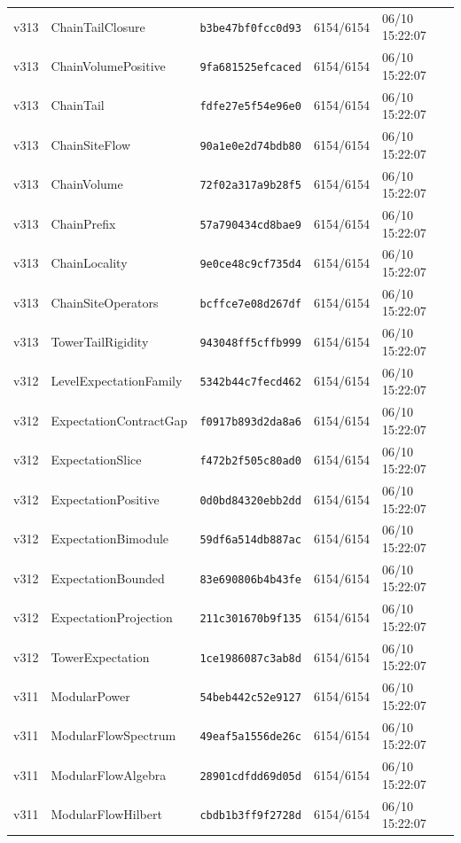 \documentclass[11pt]{article}
\theoremstyle{definition}\newtheorem{deriv}{Derivation}
\begin{document}
{\begin{longtable}{@{}lllll@{}}
v313 & ChainTailClosure & \texttt{b3be47bf0fcc0d93} & 6154/6154 & 06/10 15:22:07 \\
v313 & ChainVolumePositive & \texttt{9fa681525efcaced} & 6154/6154 & 06/10 15:22:07 \\
v313 & ChainTail & \texttt{fdfe27e5f54e96e0} & 6154/6154 & 06/10 15:22:07 \\
v313 & ChainSiteFlow & \texttt{90a1e0e2d74bdb80} & 6154/6154 & 06/10 15:22:07 \\
v313 & ChainVolume & \texttt{72f02a317a9b28f5} & 6154/6154 & 06/10 15:22:07 \\
v313 & ChainPrefix & \texttt{57a790434cd8bae9} & 6154/6154 & 06/10 15:22:07 \\
v313 & ChainLocality & \texttt{9e0ce48c9cf735d4} & 6154/6154 & 06/10 15:22:07 \\
v313 & ChainSiteOperators & \texttt{bcffce7e08d267df} & 6154/6154 & 06/10 15:22:07 \\
v313 & TowerTailRigidity & \texttt{943048ff5cffb999} & 6154/6154 & 06/10 15:22:07 \\
v312 & LevelExpectationFamily & \texttt{5342b44c7fecd462} & 6154/6154 & 06/10 15:22:07 \\
v312 & ExpectationContractGap & \texttt{f0917b893d2da8a6} & 6154/6154 & 06/10 15:22:07 \\
v312 & ExpectationSlice & \texttt{f472b2f505c80ad0} & 6154/6154 & 06/10 15:22:07 \\
v312 & ExpectationPositive & \texttt{0d0bd84320ebb2dd} & 6154/6154 & 06/10 15:22:07 \\
v312 & ExpectationBimodule & \texttt{59df6a514db887ac} & 6154/6154 & 06/10 15:22:07 \\
v312 & ExpectationBounded & \texttt{83e690806b4b43fe} & 6154/6154 & 06/10 15:22:07 \\
v312 & ExpectationProjection & \texttt{211c301670b9f135} & 6154/6154 & 06/10 15:22:07 \\
v312 & TowerExpectation & \texttt{1ce1986087c3ab8d} & 6154/6154 & 06/10 15:22:07 \\
v311 & ModularPower & \texttt{54beb442c52e9127} & 6154/6154 & 06/10 15:22:07 \\
v311 & ModularFlowSpectrum & \texttt{49eaf5a1556de26c} & 6154/6154 & 06/10 15:22:07 \\
v311 & ModularFlowAlgebra & \texttt{28901cdfdd69d05d} & 6154/6154 & 06/10 15:22:07 \\
v311 & ModularFlowHilbert & \texttt{cbdb1b3ff9f2728d} & 6154/6154 & 06/10 15:22:07 \\

\end{longtable}}
\end{document}
